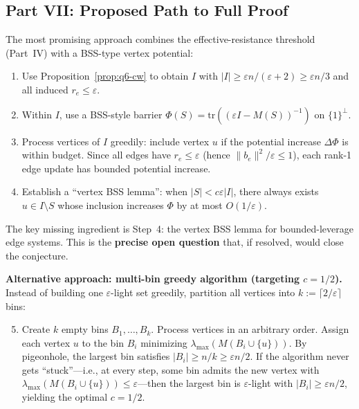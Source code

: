 \subsection*{Part VII: Proposed Path to Full Proof}

The most promising approach combines the effective-resistance threshold (Part~IV) with a BSS-type vertex potential:

\begin{enumerate}
\item Use Proposition~\ref{prop:q6-cw} to obtain $I$ with
$|I|\ge \varepsilon n/(\varepsilon+2)\ge\varepsilon n/3$ and all induced
$r_e\le\varepsilon$.
\item Within $I$, use a BSS-style barrier $\Phi(S)=\mathrm{tr}((\varepsilon I-M(S))^{-1})$ on $\{1\}^\perp$.
\item Process vertices of $I$ greedily: include vertex $u$ if the potential increase $\Delta\Phi$ is within budget. Since all edges have $r_e\le\varepsilon$ (hence $\|b_e\|^2/\varepsilon\le 1$), each rank-1 edge update has bounded potential increase.
\item Establish a ``vertex BSS lemma'': when $|S|<c\varepsilon|I|$, there always exists $u\in I\setminus S$ whose inclusion increases $\Phi$ by at most $O(1/\varepsilon)$.
\end{enumerate}

The key missing ingredient is Step~4: the vertex BSS lemma for bounded-leverage edge systems. This is the \textbf{precise open question} that, if resolved, would close the conjecture.

\medskip\noindent
\textbf{Alternative approach: multi-bin greedy algorithm (targeting $c=1/2$).}
Instead of building one $\varepsilon$-light set greedily, partition all
vertices into $k:=\lceil 2/\varepsilon\rceil$ bins:

\begin{enumerate}
\setcounter{enumi}{4}
\item Create $k$ empty bins $B_1,\dots,B_k$.
Process vertices in an arbitrary order.
Assign each vertex $u$ to the bin $B_i$
minimizing $\lambda_{\max}(M(B_i\cup\{u\}))$.
By pigeonhole, the largest bin satisfies
$|B_i|\ge n/k\ge\varepsilon n/2$.
If the algorithm never gets ``stuck''---i.e., at every step,
some bin admits the new vertex with
$\lambda_{\max}(M(B_i\cup\{u\}))\le\varepsilon$---then the largest
bin is $\varepsilon$-light with $|B_i|\ge\varepsilon n/2$,
yielding the optimal $c=1/2$.
\end{enumerate}

